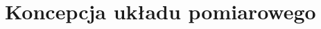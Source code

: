 \documentclass[paper=a4,DIV=12]{tfa}
\begin{document}
\section{Koncepcja układu pomiarowego}
\label{sec:NMQFB}


\end{document}
